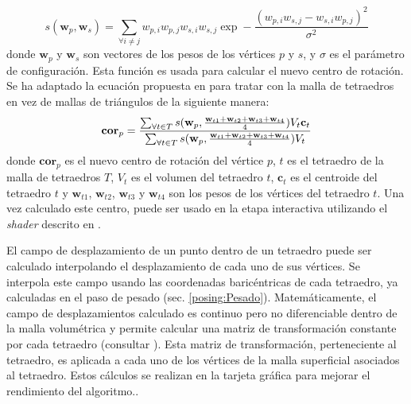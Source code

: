 \begin{equation}
 s(\textbf{w}_p,\textbf{w}_s) = 
\sum_{\forall i \neq j} w_{p,i}w_{p,j}w_{s,i}w_{s,j}\exp-\frac{(w_{p,i}w_{s,j}-w_{s,i}w_{p,j})^2}{\sigma^2}
\end{equation}
\normalsize
%
donde $\textbf{w}_p$ y $\textbf{w}_s$ son vectores de los pesos de los vértices $p$ y $s$, y $\sigma$ es el parámetro de configuración. Esta función es usada para calcular el nuevo centro de rotación. Se ha adaptado la ecuación propuesta en \cite{le2016real} para tratar con la malla de tetraedros en vez de mallas de triángulos de la siguiente manera: 
%
\begin{equation}
\textbf{cor}_p = 
\frac
  {
  \sum_{\forall t \in T}
    s(\textbf{w}_p,
      \frac{\textbf{w}_{t1}+\textbf{w}_{t2}+\textbf{w}_{t3}+\textbf{w}_{t4}}{4})
    V_t\mathbf{c}_t
  }
  {
  \sum_{\forall t \in T}
    s(\textbf{w}_p,
      \frac{\textbf{w}_{t1}+\textbf{w}_{t2}+\textbf{w}_{t3}+\textbf{w}_{t4}}{4})
    V_t
  } 
\normalsize
\end{equation}
%
donde $\textbf{cor}_p$ es el nuevo centro de rotación del vértice $p$, $t$ es el tetraedro de la malla de tetraedros $T$, $V_t$ es el volumen del tetraedro $t$, $\textbf{c}_t$ es el centroide del tetraedro $t$ y $\textbf{w}_{t1}$, $\textbf{w}_{t2}$, $\textbf{w}_{t3}$ y $\textbf{w}_{t4}$ son los pesos de los vértices del tetraedro $t$. Una vez calculado este centro, puede ser usado en la etapa interactiva utilizando el \emph{shader} descrito en \cite{le2016real}.

El campo de desplazamiento de un punto dentro de un tetraedro puede ser calculado interpolando el desplazamiento de cada uno de sus vértices. Se interpola este campo usando las coordenadas baricéntricas de cada tetraedro, ya calculadas en el paso de pesado (sec. \ref{posing:Pesado}). Matemáticamente, el campo de desplazamientos calculado es continuo pero no diferenciable dentro de la malla volumétrica y permite calcular una matriz de transformación constante por cada tetraedro (consultar \cite{Muller2004}).  Esta matriz de transformación, perteneciente al tetraedro, es aplicada a cada uno de los vértices de la malla superficial asociados al tetraedro. Estos cálculos se realizan en la tarjeta gráfica para mejorar el rendimiento del algoritmo..

